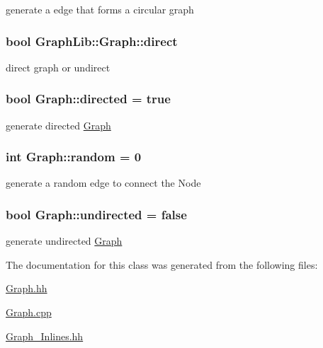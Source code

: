 generate a edge that forms a circular graph \hypertarget{classGraphLib_1_1Graph_a9425d5b9f754f74abd6030e2ece5d09d}{
\subsubsection[{direct}]{\setlength{\rightskip}{0pt plus 5cm}bool Graph\-Lib\-::\-Graph\-::direct\hspace{0.3cm}{\ttfamily [private]}}}\label{classGraphLib_1_1Graph_a9425d5b9f754f74abd6030e2ece5d09d}
direct graph or undirect \hypertarget{classGraphLib_1_1Graph_a3111bb6cc59aedbc4290ed1b37668336}{
\subsubsection[{directed}]{\setlength{\rightskip}{0pt plus 5cm}bool Graph\-::directed = true\hspace{0.3cm}{\ttfamily [static]}}}\label{classGraphLib_1_1Graph_a3111bb6cc59aedbc4290ed1b37668336}
generate directed \hyperlink{classGraphLib_1_1Graph}{Graph} \hypertarget{classGraphLib_1_1Graph_a2286bc629c2b3e39e49428a90a9ba89f}{
\subsubsection[{random}]{\setlength{\rightskip}{0pt plus 5cm}int Graph\-::random = 0\hspace{0.3cm}{\ttfamily [static]}}}\label{classGraphLib_1_1Graph_a2286bc629c2b3e39e49428a90a9ba89f}
generate a random edge to connect the Node \hypertarget{classGraphLib_1_1Graph_ac0c94d852cc820c10aefd1ef0f587fb0}{
\subsubsection[{undirected}]{\setlength{\rightskip}{0pt plus 5cm}bool Graph\-::undirected = false\hspace{0.3cm}{\ttfamily [static]}}}\label{classGraphLib_1_1Graph_ac0c94d852cc820c10aefd1ef0f587fb0}
generate undirected \hyperlink{classGraphLib_1_1Graph}{Graph} 

The documentation for this class was generated from the following files\-:\begin{DoxyCompactItemize}
\item 
\hyperlink{Graph_8hh}{Graph.\-hh}\item 
\hyperlink{Graph_8cpp}{Graph.\-cpp}\item 
\hyperlink{Graph__Inlines_8hh}{Graph\-\_\-\-Inlines.\-hh}\end{DoxyCompactItemize}
